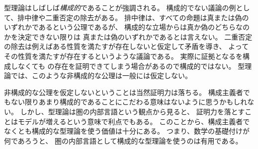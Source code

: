 \documentclass[index]{subfiles}
\begin{document}
型理論はしばしば\emph{構成的}であることが強調される。
構成的でない議論の例として、排中律や二重否定の除去がある。
排中律は、すべての命題は真または偽のいずれかであるという公理であるが、
構成的な立場からは真か偽のどちらなのかを決定できない限りは
真または偽のいずれかであるとは言えない。
二重否定の除去は例えばある性質を満たすが存在しないと仮定して矛盾を導き、
よってその性質を満たすが存在するというような議論である。
実際に証拠となるを構成しなくても
の存在を証明できてしまう場合があるので構成的ではない。
型理論では、このような非構成的な公理は一般には仮定しない。

非構成的な公理を仮定しないということは当然証明力は落ちる。
構成主義者でもない限りあまり構成的であることにこだわる意味はないように思うかもしれない。
しかし、型理論は圏の内部言語という観点から見ると、
証明力を落とすことはモデルが増えるという意味で利点でもある。
このことから、構成主義者でなくとも構成的な型理論を使う価値は十分にある。
つまり、数学の基礎付けが何であろうと、
圏の内部言語として構成的な型理論を使うのは有用である。
\end{document}
